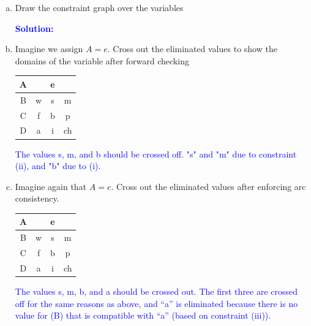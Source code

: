 \documentclass[a4paper]{article}
\begin{document}
\begin{enumerate}[(a)]
\item Draw the constraint graph over the variables

\textcolor{blue}{\textbf{Solution:}}



\item Imagine we assign $A=e$. Cross out the eliminated values to show the domains of the variable after forward checking
\begin{center}
\begin{tabular}{|c|c|c|c|}
\hline
A &  & e &  \\
\hline
B& w & s  & m  \\
\hline
C& f & b  & p  \\
\hline
D& a & i  & ch  \\
\hline
\end{tabular}
\end{center}

\textcolor{blue}{The values s, m, and b should be crossed off. "s" and "m" due to constraint (ii), and "b" due to (i).}

\item Imagine again that $A=e$. Cross out the eliminated values after enforcing arc consistency.
\begin{center}
\begin{tabular}{|c|c|c|c|}
\hline
A &  & e &  \\
\hline
B& w & s  & m  \\
\hline
C& f & b  & p  \\
\hline
D& a & i  & ch  \\
\hline
\end{tabular}
\end{center}

\textcolor{blue}{The values s, m, b, and a should be crossed out.  The first three are crossed off for the same reasons as above, and “a” is eliminated because there is no value for (B) that is compatible with “a” (based on constraint (iii)).}


\end{enumerate}
\end{document}
